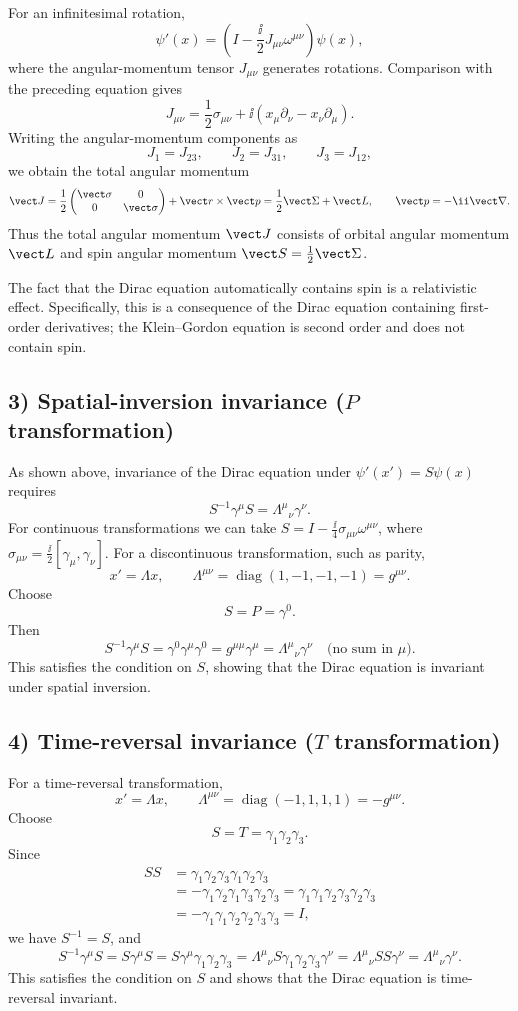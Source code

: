 For an infinitesimal rotation,
\[
\psi'(x)=\left(I-\frac{\ii}{2}J_{\mu\nu}\omega^{\mu\nu}\right)\psi(x),
\]
where the angular-momentum tensor $J_{\mu\nu}$ generates rotations. Comparison with the preceding equation gives
\[
J_{\mu\nu}=\frac12\sigma_{\mu\nu}
+\ii(x_\mu\partial_\nu-x_\nu\partial_\mu).
\]
Writing the angular-momentum components as
\[
J_1=J_{23},\qquad J_2=J_{31},\qquad J_3=J_{12},
\]
we obtain the total angular momentum
\[
\vect J=\frac12\begin{pmatrix}\vect\sigma&0\\0&\vect\sigma\end{pmatrix}
+\vect r\times\vect p
=\frac12\vect\Sigma+\vect L,
\qquad \vect p=-\ii\vect\nabla.
\]
Thus the total angular momentum $\vect J$ consists of orbital angular momentum $\vect L$ and spin angular momentum $\vect S=\frac12\vect\Sigma$.

The fact that the Dirac equation automatically contains spin is a relativistic effect. Specifically, this is a consequence of the Dirac equation containing first-order derivatives; the Klein--Gordon equation is second order and does not contain spin.

\subsection*{3) Spatial-inversion invariance ($P$ transformation)}
As shown above, invariance of the Dirac equation under $\psi'(x')=S\psi(x)$ requires
\[
S^{-1}\gamma^\mu S=\Lambda^\mu{}_{\nu}\gamma^\nu.
\]
For continuous transformations we can take $S=I-\frac{\ii}{4}\sigma_{\mu\nu}\omega^{\mu\nu}$, where $\sigma_{\mu\nu}=\frac{\ii}{2}[\gamma_\mu,\gamma_\nu]$. For a discontinuous transformation, such as parity,
\[
x'=\Lambda x,\qquad
\Lambda^{\mu\nu}=\operatorname{diag}(1,-1,-1,-1)=g^{\mu\nu}.
\]
Choose
\[
S=P=\gamma^0.
\]
Then
\[
S^{-1}\gamma^\mu S=\gamma^0\gamma^\mu\gamma^0
=g^{\mu\mu}\gamma^\mu=\Lambda^\mu{}_{\nu}\gamma^\nu
\quad\text{(no sum in $\mu$)}.
\]
This satisfies the condition on $S$, showing that the Dirac equation is invariant under spatial inversion.

\subsection*{4) Time-reversal invariance ($T$ transformation)}
For a time-reversal transformation,
\[
x'=\Lambda x,\qquad
\Lambda^{\mu\nu}=\operatorname{diag}(-1,1,1,1)=-g^{\mu\nu}.
\]
Choose
\[
S=T=\gamma_1\gamma_2\gamma_3.
\]
Since
\begin{align*}
SS&=\gamma_1\gamma_2\gamma_3\gamma_1\gamma_2\gamma_3\\
&=-\gamma_1\gamma_2\gamma_1\gamma_3\gamma_2\gamma_3
=\gamma_1\gamma_1\gamma_2\gamma_3\gamma_2\gamma_3\\
&=-\gamma_1\gamma_1\gamma_2\gamma_2\gamma_3\gamma_3=I,
\end{align*}
we have $S^{-1}=S$, and
\[
S^{-1}\gamma^\mu S=S\gamma^\mu S
=S\gamma^\mu\gamma_1\gamma_2\gamma_3
=\Lambda^\mu{}_{\nu}S\gamma_1\gamma_2\gamma_3\gamma^\nu
=\Lambda^\mu{}_{\nu}SS\gamma^\nu
=\Lambda^\mu{}_{\nu}\gamma^\nu.
\]
This satisfies the condition on $S$ and shows that the Dirac equation is time-reversal invariant.

